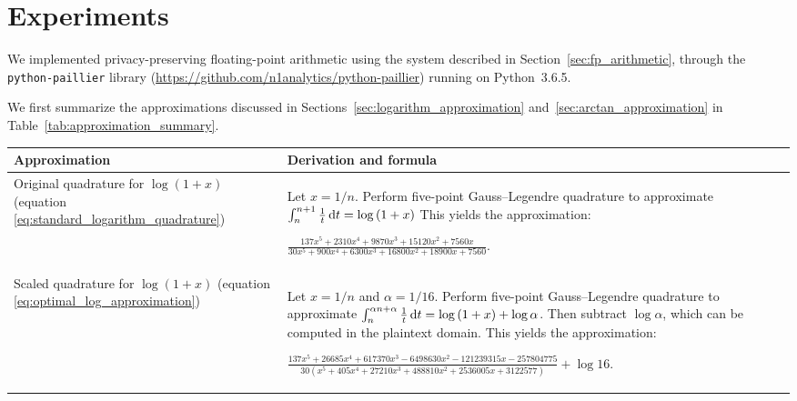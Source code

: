 \section{Experiments}
We implemented privacy-preserving floating-point arithmetic using the system described in Section~\ref{sec:fp_arithmetic}, through the \texttt{python-paillier} library (\url{https://github.com/n1analytics/python-paillier}) running on Python~3.6.5.

We first summarize the approximations discussed in Sections~\ref{sec:logarithm_approximation} and~\ref{sec:arctan_approximation} in Table~\ref{tab:approximation_summary}.

\begin{table*}[ht]
	\caption{Summary of approximations for logarithm and inverse tangent}
	\label{tab:approximation_summary}
    \begin{tabular}{
        p{}
        p{}}
		\toprule
		Approximation & Derivation and formula\\
		\midrule
            Original quadrature for $\log\left(1+x\right)$ (equation \ref{eq:standard_logarithm_quadrature})
            & Let $x=1/n$. Perform five-point Gauss--Legendre quadrature to approximate $\int_{n}^{n+1}{\frac{1}{t}\mathop{}\!\mathrm{d} t} = \log\left(1+x\right)$ This yields the approximation:
            \begin{center}
                $\displaystyle 
            \frac{137x^5 + 2310x^4 + 9870x^3 + 15120x^2 + 7560x}
            {30x^5 + 900x^4 + 6300x^3 + 16800x^2 + 18900x + 7560}$.
            \end{center}
            \\[10pt]

            Scaled quadrature for $\log\left(1+x\right)$ (equation \ref{eq:optimal_log_approximation})
            & Let $x=1/n$ and $\alpha= 1/16$. Perform five-point Gauss--Legendre quadrature to approximate $\int_{n}^{\alpha n + \alpha}{\frac{1}{t}\mathop{}\!\mathrm{d} t} = \log\left(1+x\right) + \log\alpha$. 
            Then subtract $\log\alpha$, which can be computed in the plaintext domain. This yields the approximation:
            \begin{center}
            $\displaystyle 
            \frac{137x^5 + 26685x^4 + 617370x^3 - 6498630x^2 - 121239315x - 257804775}
            {30(x^5 + 405x^4 + 27210x^3 + 488810x^2 + 2536005x + 3122577)}
            + \log{16}$.
            \end{center}
            \\[10pt]
            

\end{tabular}
\end{table*}
